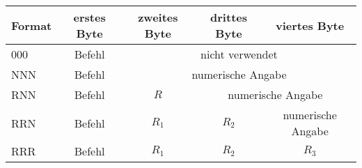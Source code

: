 \begin{center}
  \begin{tabular}{|l||*{4}{c|}}
    \hline
    Format & erstes Byte & zweites Byte  & drittes Byte  & viertes Byte
    \\\hline\hline
    000 & Befehl & \multicolumn{3}{c|}{nicht verwendet}       \\\hline
    NNN & Befehl & \multicolumn{3}{c|}{numerische Angabe}       \\\hline
    RNN & Befehl & $R$ & \multicolumn{2}{c|}{numerische Angabe} \\\hline
    RRN & Befehl & $R_{1}$ & $R_{2}$ & numerische Angabe        \\\hline
    RRR & Befehl & $R_{1}$ & $R_{2}$ & $R_{3}$                  \\\hline
  \end{tabular}
\end{center}



